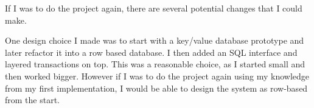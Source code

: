 \documentclass[12pt,twoside,notitlepage]{report}
\begin{document}
If I was to do the project again, there are several potential changes that I could make.


One design choice I made was to start with a key/value database prototype and later
refactor it into a row based database. I then added an SQL interface and layered transactions on
top. This was a reasonable choice, as I started small and then worked bigger. However if I was to
do the project again using my knowledge from my first implementation, I would be able to
design the system as row-based from the start.


\end{document}
